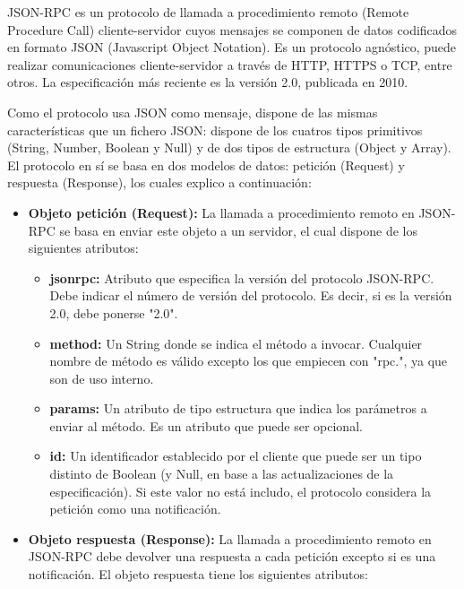 \documentclass[spanish,12pt, a4paper, twoside]{paper}
\begin{document}
JSON-RPC es un protocolo de llamada a procedimiento remoto (Remote Procedure Call) cliente-servidor cuyos mensajes se componen de datos codificados en formato JSON (Javascript Object Notation). Es un protocolo agnóstico, puede realizar comunicaciones cliente-servidor a través de HTTP, HTTPS o TCP, entre otros. La especificación más reciente es la versión 2.0, publicada en 2010.

Como el protocolo usa JSON como mensaje, dispone de las mismas características que un fichero JSON: dispone de los cuatros tipos primitivos (String, Number, Boolean y Null) y de dos tipos de estructura (Object y Array).
El protocolo en sí se basa en dos modelos de datos: petición (Request) y respuesta (Response), los cuales explico a continuación:

\begin{itemize}
\item \textbf{Objeto petición (Request):} La llamada a procedimiento remoto en JSON-RPC se basa en enviar este objeto a un servidor, el cual dispone de los siguientes atributos:

\begin{itemize}
\item \textbf{jsonrpc:} Atributo que especifica la versión del protocolo JSON-RPC. Debe indicar el número de versión del protocolo. Es decir, si es la versión 2.0, debe ponerse "2.0".

\item \textbf{method:} Un String donde se indica el método a invocar. Cualquier nombre de método es válido excepto los que empiecen con "rpc.", ya que son de uso interno.

\item \textbf{params:} Un atributo de tipo estructura que indica los parámetros a enviar al método. Es un atributo que puede ser opcional.

\item \textbf{id:} Un identificador establecido por el cliente que puede ser un tipo distinto de Boolean (y Null, en base a las actualizaciones de la especificación). Si este valor no está includo, el protocolo considera la petición como una notificación.
\end{itemize}

\item \textbf{Objeto respuesta (Response):} La llamada a procedimiento remoto en JSON-RPC debe devolver una respuesta a cada petición excepto si es una notificación. El objeto respuesta tiene los siguientes atributos:


\end{itemize}
\end{document}

